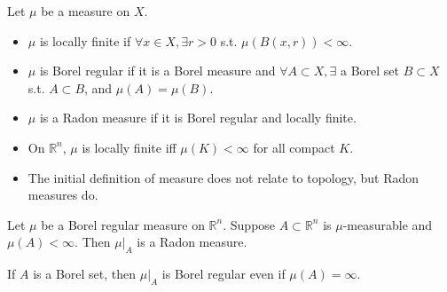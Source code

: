     \begin{definition}
        Let $\mu$ be a measure on $X$.
        \begin{itemize}
            \item[(i)] $\mu$ is locally finite if $\forall x \in X,\exists r>0$ s.t. $\mu(B(x,r))<\infty$.
            \item[(ii)] $\mu$ is Borel regular if it is a Borel measure and $\forall A\subset X, \exists$ a Borel set $B \subset X$ s.t. $A\subset B$, and $\mu(A)=\mu(B)$.
            \item[(iii)] $\mu$ is a Radon measure if it is Borel regular and locally finite.
        \end{itemize}
    \end{definition}

    \begin{remark}
        \begin{itemize}
            \item[(i)] On $\mathbb{R}^{n}$, $\mu$ is locally finite iff $\mu(K)<\infty$ for all compact $K$. 
            \item[(ii)] The initial definition of measure does not relate to topology, but Radon measures do.
        \end{itemize}
    \end{remark}

    \begin{theorem}
        Let $\mu$ be a Borel regular measure on $\mathbb{R}^{n}$. Suppose $A \subset \mathbb{R}^{n}$ is $\mu$-measurable and $\mu(A)<\infty$. Then $\mu|_{A}$ is a Radon measure.
    \end{theorem}

    \begin{remark}
        If $A$ is a Borel set, then $\mu|_{A}$ is Borel regular even if $\mu(A)=\infty$.
    \end{remark}

